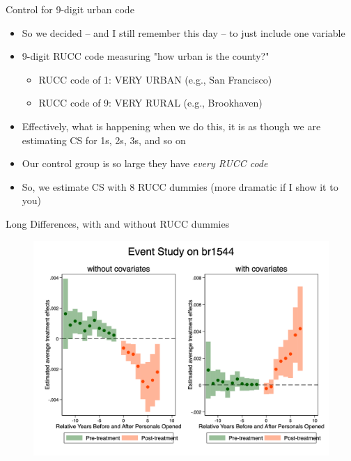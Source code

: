 \documentclass{beamer}
\begin{document}
\begin{frame}{Control for 9-digit urban code}

\begin{itemize}

\item So we decided -- and I still remember this day -- to just include one variable
\item 9-digit RUCC code measuring "how urban is the county?"
	\begin{itemize}
	\item RUCC code of 1: VERY URBAN (e.g., San Francisco)
	\item RUCC code of 9: VERY RURAL (e.g., Brookhaven)
	\end{itemize}
\item Effectively, what is happening when we do this, it is as though we are estimating CS for 1s, 2s, 3s, and so on
\item Our control group is so large they have \emph{every RUCC code}
\item So, we estimate CS with 8 RUCC dummies (more dramatic if I show it to you)
\end{itemize}

\end{frame}




\begin{frame}{Long Differences, with and without RUCC dummies}

\begin{figure}
    \centering
    \includegraphics[height=0.85\textheight]{./lecture_includes/es_br1544_combined.png}
\end{figure}

\end{frame}
\end{document}
